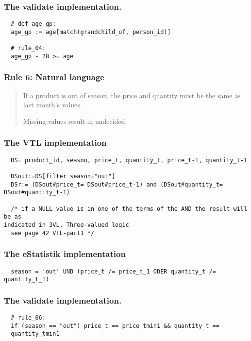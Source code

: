 \subsubsection*{The validate implementation.}
\begin{verbatim}
  # def_age_gp:
  age_gp := age[match(grandchild_of, person_id)]

  # rule_04:
  age_gp - 28 >= age
\end{verbatim}


\newpage

\subsubsection*{  Rule 6: Natural language}
\begin{quote}


If a product is out of season, the price and quantity must be the same as last month's values.

Missing values result in undecided.


\end{quote}
\subsubsection*{The VTL implementation}
\begin{verbatim}
  DS= product_id, season, price_t, quantity_t, price_t-1, quantity_t-1

  DSout:=DS[filter season="out"]
  DSr:= (DSout#price_t= DSout#price_t-1) and (DSout#quantity_t=
DSout#quantity_t-1)

  /* if a NULL value is in one of the terms of the AND the result will be as
indicated in 3VL, Three-valued logic
  see page 42 VTL-part1 */
\end{verbatim}
\subsubsection*{The eStatistik implementation}
\begin{verbatim}
  season = 'out' UND (price_t /= price_t_1 ODER quantity_t /= quantity_t_1)
\end{verbatim}
\subsubsection*{The validate implementation.}
\begin{verbatim}
  # rule_06:
  if (season == "out") price_t == price_tmin1 && quantity_t ==
  quantity_tmin1
\end{verbatim}


